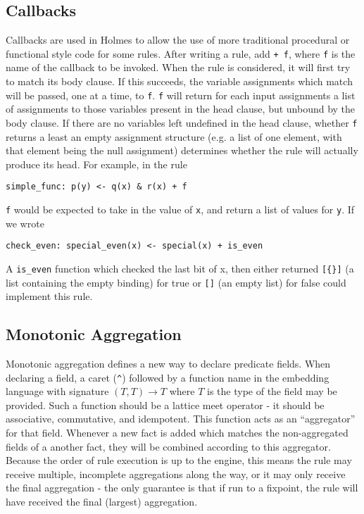 \subsection{Callbacks}
\label{holmes:sec:callback}
Callbacks are used in Holmes to allow the use of more traditional procedural or functional style code for some rules.
After writing a rule, add \texttt{+ f}, where \texttt{f} is the name of the callback to be invoked.
When the rule is considered, it will first try to match its body clause.
If this succeeds, the variable assignments which match will be passed, one at a time, to \texttt{f}.
\texttt{f} will return for each input assignments a list of assignments to those variables present in the head clause, but unbound by the body clause.
If there are no variables left undefined in the head clause, whether \texttt{f} returns a least an empty assignment structure (e.g. a list of one element, with that element being the null assignment) determines whether the rule will actually produce its head.
For example, in the rule
\begin{verbatim}
simple_func: p(y) <- q(x) & r(x) + f
\end{verbatim}
\texttt{f} would be expected to take in the value of \texttt{x}, and return a list of values for \texttt{y}.
If we wrote
\begin{verbatim}
check_even: special_even(x) <- special(x) + is_even
\end{verbatim}
A \texttt{is_even} function which checked the last bit of x, then either returned \texttt{[\{\}]} (a list containing the empty binding) for true or \texttt{[]} (an empty list) for false could implement this rule.

\subsection{Monotonic Aggregation}
\label{holmes:sec:agg}
Monotonic aggregation defines a new way to declare predicate fields.
When declaring a field, a caret (\texttt{\^{}}) followed by a function name in the embedding language with signature $(T, T) \rightarrow T$ where $T$ is the type of the field may be provided.
Such a function should be a lattice meet operator - it should be associative, commutative, and idempotent.
This function acts as an ``aggregator'' for that field.
Whenever a new fact is added which matches the non-aggregated fields of a another fact, they will be combined according to this aggregator.
Because the order of rule execution is up to the engine, this means the rule may receive multiple, incomplete aggregations along the way, or it may only receive the final aggregation - the only guarantee is that if run to a fixpoint, the rule will have received the final (largest) aggregation.

